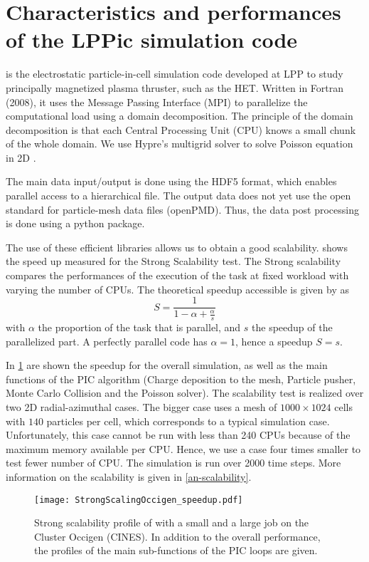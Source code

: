 

\section{Characteristics and performances of the LPPic simulation code }
\label{sec-lppic}


\LPPic is the electrostatic particle-in-cell simulation code developed at \ac{LPP} to study principally magnetized plasma thruster, such as the \ac{HET}.
Written in Fortran (2008), it uses the Message Passing Interface (MPI) to parallelize the computational load using a domain decomposition.
The principle of the domain decomposition is that each Central Processing Unit (CPU) knows a small chunk of the whole domain.
We use {\sc Hypre}'s multigrid solver to solve Poisson equation in \ac{2D} \citep{falgout2002}.

The main data input/output is done using the HDF5 format, which enables parallel access to a hierarchical file.
The output data does not yet use the open standard for particle-mesh data files (openPMD).
Thus, the data post processing is done using a python package.

The use of these efficient libraries allows us to obtain a good scalability.
 shows the speed up measured for the Strong Scalability test.
The Strong scalability compares the performances of the execution of the task at fixed workload with varying the number of CPUs.
The theoretical speedup accessible is given by \citet{amdahl1967} as
\begin{equation} \label{eq-amdahl}
  S = \frac{1}{1 - \alpha + \frac{\alpha}{s}}
\end{equation}
with $\alpha$ the proportion of the task that is parallel, and $s$ the speedup of the parallelized part.
A perfectly parallel code has $\alpha=1$, hence a speedup $S=s$.

In \cref{fig-strongperfo} are shown the speedup for the overall simulation, as well as the main functions of the \ac{PIC} algorithm (Charge deposition to the mesh, Particle pusher, Monte Carlo Collision and the Poisson solver).
The scalability test is realized over two \ac{2D} radial-azimuthal cases. 
The bigger case uses a mesh of $1000\times1024$ cells with $140$ particles per cell, which corresponds to a typical simulation case.
Unfortunately, this case cannot be run with less than 240 CPUs because of the maximum memory available per CPU. 
Hence, we use a case four times smaller to test fewer number of CPU.
The simulation is run over 2000 time steps.
More information on the scalability is given in \cref{an-scalability}.
\begin{figure}[hbt]
  \centering
  \texttt{[image: StrongScalingOccigen\_speedup.pdf]}
  \caption{Strong scalability profile of \LPPic with a small and a large job on the Cluster Occigen (CINES). In addition to the overall performance, the profiles of the main sub-functions of the \acs{PIC} loops are given. }
  \label{fig-strongperfo}
\end{figure}


